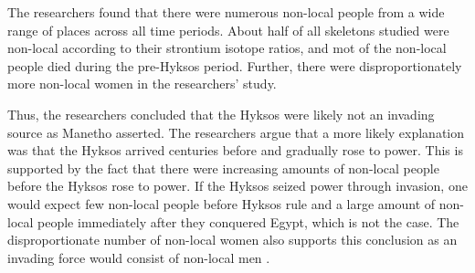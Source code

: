 \documentclass[a4paper, 12pt]{article}
\begin{document}
The researchers found that there were numerous non-local people from a wide range
of places across all time periods. About half of all skeletons studied were non-local
according to their strontium isotope ratios, and mot of the non-local people died
during the pre-Hyksos period. Further, there were disproportionately more non-local
women in the researchers' study.

Thus, the researchers concluded that the Hyksos were likely not an invading source
as Manetho asserted. The researchers argue that a more likely explanation was that
the Hyksos arrived centuries before and gradually rose to power. This is supported
by the fact that there were increasing amounts of non-local people before the Hyksos
rose to power. If the Hyksos seized power through invasion, one would expect few non-local
people before Hyksos rule and a large amount of non-local people immediately after they conquered Egypt, which
is not the case. The disproportionate number of non-local women also supports this conclusion
as an invading force would consist of non-local men \citep{stantis2020}.




\end{document}
